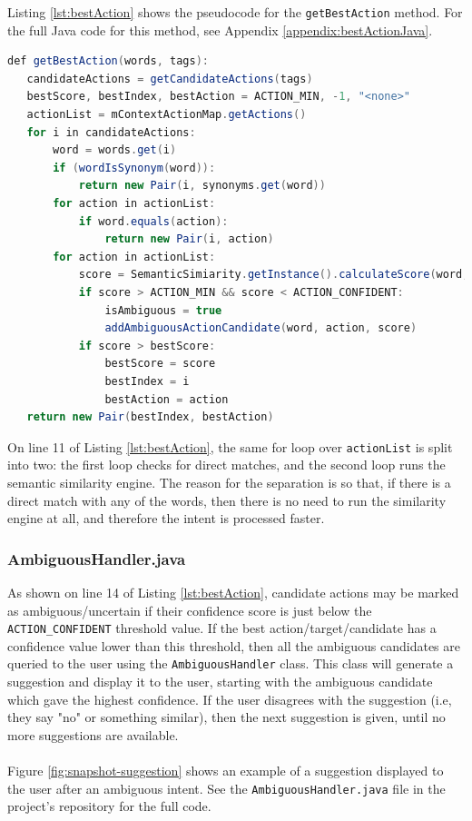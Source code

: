 \documentclass[12pt]{article}
\begin{document}
Listing \ref{lst:bestAction} shows the pseudocode for the \texttt{getBestAction} method. For the full Java code for this method, see Appendix \ref{appendix:bestActionJava}.
\\
\begin{lstlisting}[language=Java, caption=getBestAction() pseudocode, label={lst:bestAction}]
def getBestAction(words, tags):
   candidateActions = getCandidateActions(tags)
   bestScore, bestIndex, bestAction = ACTION_MIN, -1, "<none>"
   actionList = mContextActionMap.getActions()
   for i in candidateActions:
       word = words.get(i)
       if (wordIsSynonym(word)):
           return new Pair(i, synonyms.get(word))
       for action in actionList:
           if word.equals(action):
               return new Pair(i, action)
       for action in actionList:
           score = SemanticSimiarity.getInstance().calculateScore(word, action)
           if score > ACTION_MIN && score < ACTION_CONFIDENT:
               isAmbiguous = true
               addAmbiguousActionCandidate(word, action, score)
           if score > bestScore:
               bestScore = score
               bestIndex = i
               bestAction = action
   return new Pair(bestIndex, bestAction)
\end{lstlisting}

On line 11 of Listing \ref{lst:bestAction}, the same for loop over \texttt{actionList} is split into two: the first loop checks for direct matches, and the second loop runs the semantic similarity engine. The reason for the separation is so that, if there is a direct match with any of the words, then there is no need to run the similarity engine at all, and therefore the intent is processed faster.

\subsubsection{AmbiguousHandler.java}

As shown on line 14 of Listing \ref{lst:bestAction}, candidate actions may be marked as ambiguous/uncertain if their confidence score is just below the \texttt{ACTION\_CONFIDENT} threshold value. If the best action/target/candidate has a confidence value lower than this threshold, then all the ambiguous candidates are queried to the user using the \texttt{AmbiguousHandler} class. This class will generate a suggestion and display it to the user, starting with the ambiguous candidate which gave the highest confidence. If the user disagrees with the suggestion (i.e, they say "no" or something similar), then the next suggestion is given, until no more suggestions are available.
\\
\\
Figure \ref{fig:snapshot-suggestion} shows an example of a suggestion displayed to the user after an ambiguous intent. See the \texttt{AmbiguousHandler.java} file in the project's repository for the full code.
\end{document}

